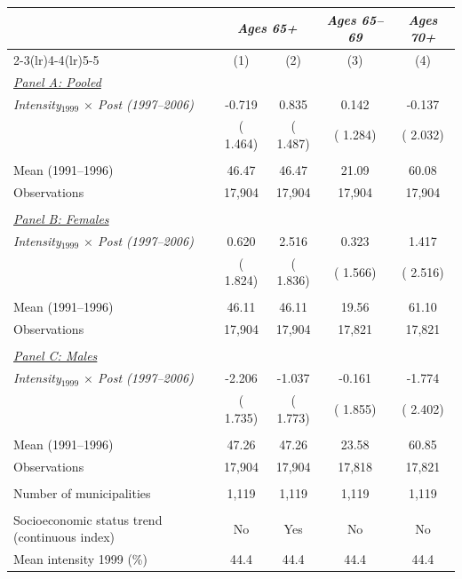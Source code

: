 \begin{tabular}{lcccc} \hline \hline
& \multicolumn{2}{c}{\textit{Ages 65+}} & \multicolumn{1}{c}{\textit{Ages 65--69}} & \multicolumn{1}{c}{\textit{Ages 70+}} \\ \cmidrule(lr){2-3}\cmidrule(lr){4-4}\cmidrule(lr){5-5}
& \multicolumn{1}{c}{(1)} & \multicolumn{1}{c}{(2)} & \multicolumn{1}{c}{(3)} & \multicolumn{1}{c}{(4)} \\ \toprule
\underline{\textit{Panel A: Pooled}}  \\ 
\textit{Intensity$_{1999}$ $\times$ Post (1997--2006)} &       -0.719 &        0.835 &        0.142 &       -0.137 \\ 
 & (       1.464) & (       1.487) & (       1.284) & (       2.032) \\ 
  & & & & \\ 
Mean (1991--1996) &        46.47 &        46.47 &        21.09 &        60.08 \\ 
Observations &       17,904 &       17,904 &       17,904 &       17,904 \\ 
  & & & & \\ 
\underline{\textit{Panel B: Females}}  \\ 
\textit{Intensity$_{1999}$ $\times$ Post (1997--2006)} &        0.620 &        2.516 &        0.323 &        1.417 \\ 
 & (       1.824) & (       1.836) & (       1.566) & (       2.516) \\ 
  & & & & \\ 
Mean (1991--1996) &        46.11 &        46.11 &        19.56 &        61.10 \\ 
Observations &       17,904 &       17,904 &       17,821 &       17,821 \\ 
  & & & & \\ 
\underline{\textit{Panel C: Males}}  \\ 
\textit{Intensity$_{1999}$ $\times$ Post (1997--2006)} &       -2.206 &       -1.037 &       -0.161 &       -1.774 \\ 
 & (       1.735) & (       1.773) & (       1.855) & (       2.402) \\ 
  & & & & \\ 
Mean (1991--1996) &        47.26 &        47.26 &        23.58 &        60.85 \\ 
Observations &       17,904 &       17,904 &       17,818 &       17,821 \\ 
  & & & & \\ 
Number of municipalities &        1,119 &        1,119 &        1,119 &        1,119 \\ 
  & & & & \\ 
Socioeconomic status trend (continuous index) & No & Yes & No & No \\ 
Mean intensity 1999 (\%) &   44.4 &   44.4 &   44.4 &   44.4 \\ 
\bottomrule
\end{tabular}